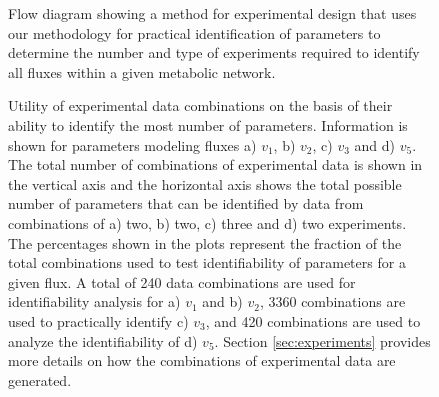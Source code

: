 \documentclass[10pt]{article}
\begin{document}
\begin{figure}[!tbhp]
	\caption{Flow diagram showing a method for experimental design that uses our methodology for practical identification of parameters to determine the number and type of experiments required to identify all fluxes within a given metabolic network.}\label{fig:ident-design}
\end{figure}

\begin{figure}[!tbhp]
	\caption{Utility of experimental data combinations on the basis of their ability to identify the most number of parameters. Information is shown for parameters modeling fluxes a) $v_1$, b) $v_2$, c) $v_3$ and d) $v_5$. The total number of combinations of experimental data is shown in the vertical axis and the horizontal axis shows the total possible number of parameters that can be identified by data from combinations of a) two, b) two, c) three and d) two experiments. The percentages shown in the plots represent the fraction of the total combinations used to test identifiability of parameters for a given flux. A total of 240 data combinations are used for identifiability analysis for a) $v_1$ and b) $v_2$, 3360 combinations are used to practically identify c) $v_3$, and 420 combinations are used to analyze the identifiability of d) $v_5$. Section \ref{sec:experiments} provides more details on how the combinations of experimental data are generated.}\label{fig:data_utility}
\end{figure}	
\end{document}
